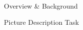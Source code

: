 \documentclass[final,t]{beamer}
\begin{document}
\begin{frame}{}
\begin{columns}[t]
\begin{column}{.33\linewidth}
\begin{block}{Overview \& Background}
\begin{center}
\begin{minipage}{.85\textwidth}
%

\end{minipage}
\end{center}
\end{block}

\begin{block}{Picture Description Task}
\begin{center}
\begin{minipage}{.85\textwidth}


\end{minipage}
\end{center}
\end{block}
\end{column}
\end{columns}
\end{frame}
\end{document}
